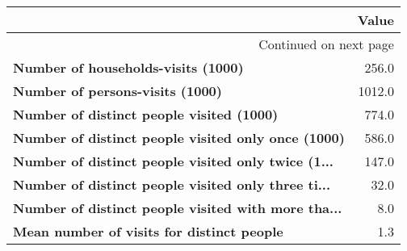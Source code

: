 \begin{longtable}{lr}
\toprule
{} &   Value \\
\midrule
\endhead
\midrule
\multicolumn{2}{r}{{Continued on next page}} \\
\midrule
\endfoot

\bottomrule
\endlastfoot
\textbf{Number of households-visits (1000)                } &   256.0 \\
\textbf{Number of persons-visits (1000)                   } &  1012.0 \\
\textbf{Number of distinct people visited (1000)          } &   774.0 \\
\textbf{Number of distinct people visited only once (1000)} &   586.0 \\
\textbf{Number of distinct people visited only twice (1...} &   147.0 \\
\textbf{Number of distinct people visited only three ti...} &    32.0 \\
\textbf{Number of distinct people visited with more tha...} &     8.0 \\
\textbf{Mean number of visits for distinct people         } &     1.3 \\
\end{longtable}
